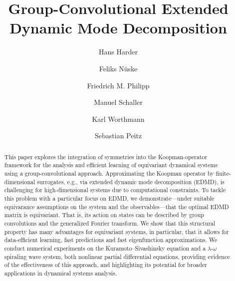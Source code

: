 \documentclass[preprint,12pt,authoryear]{elsarticle}
\begin{document}
\begin{frontmatter}
    

\title{Group-Convolutional Extended Dynamic Mode Decomposition}

\author[1,6]{Hans Harder}
\author[2]{Feliks Nüske}
\author[3]{Friedrich M. Philipp}
\author[4]{Manuel Schaller}
\author[3]{Karl Worthmann}
\author[5,6]{Sebastian Peitz}



\begin{abstract}
This paper explores the integration of symmetries into the Koopman-operator framework for the analysis and efficient learning of equivariant dynamical systems using a group-convolutio\-nal approach. Approximating the Koopman operator by finite-dimensional surrogates, e.g., via extended dynamic mode decomposition (EDMD), is challenging for high-dimensional systems due to computational constraints. 
To tackle this problem with a particular focus on EDMD, we demonstrate---under suitable equivarance assumptions on the system and the observables---that the optimal EDMD matrix is %
equivariant. That is, its action on states can be described by group convolutions and the generalized Fourier transform.
We show that this %
structural property
has many advantages for equivariant systems, in particular, that it allows for data-efficient learning, fast predictions and fast eigenfunction approximations.
We conduct numerical experiments on the Kuramoto--Sivashinsky equation and a $\lambda$-$\omega$ spiraling wave system, both nonlinear partial differential equations, providing evidence of the effectiveness of this approach, and highlighting its potential for broader applications in dynamical systems analysis.
\end{abstract}

\end{frontmatter}
\end{document}

